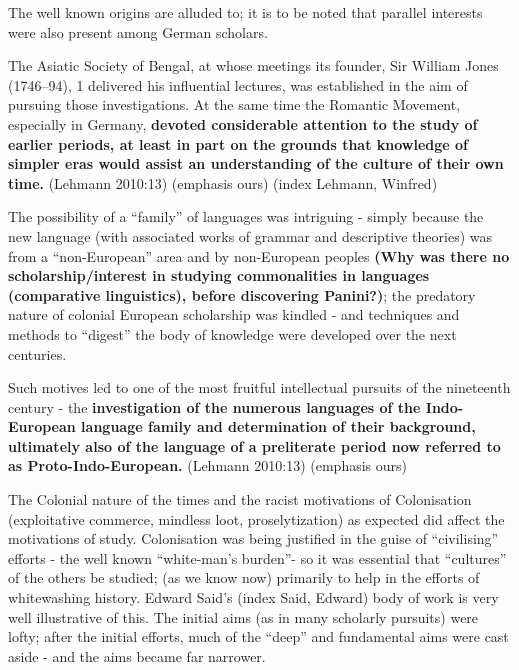 The well known origins are alluded to; it is to be noted that parallel interests were also present among German scholars.

\begin{myquote}
The Asiatic Society of Bengal, at whose meetings its founder, Sir William Jones (1746–94), 1 delivered his influential lectures, was established in the aim of pursuing those investigations. At the same time the Romantic Movement, especially in Germany, \textbf{devoted considerable attention to the study of earlier periods, at least in part on the grounds that knowledge of simpler eras would assist an understanding of the culture of their own time.} (Lehmann 2010:13) (emphasis ours) (index Lehmann, Winfred)
\end{myquote}

The possibility of a “family” of languages was intriguing - simply because the new language (with associated works of grammar and descriptive theories) was from a “non-European” area and by non-European peoples \textbf{(Why was there no scholarship/interest in studying commonalities in languages (comparative linguistics), before discovering Panini?)}; the predatory nature of colonial European scholarship was kindled - and techniques and methods to “digest” the body of knowledge were developed over the next centuries.

\begin{myquote}
Such motives led to one of the most fruitful intellectual pursuits of the nineteenth century - the \textbf{investigation of the numerous languages of the Indo-European language family and determination of their background, ultimately also of the language of a preliterate period now referred to as Proto-Indo-European. } (Lehmann 2010:13) (emphasis ours)
\end{myquote}

The Colonial nature of the times and the racist motivations of Colonisation (exploitative commerce, mindless loot, proselytization) as expected did affect the motivations of study. Colonisation was being justified in the guise of “civilising” efforts - the well known “white-man’s burden”- so it was essential that “cultures” of the others be studied; (as we know now) primarily to help in the efforts of whitewashing history. Edward Said’s (index Said, Edward) body of work is very well illustrative of this. The initial aims (as in many scholarly pursuits) were lofty; after the initial efforts, much of the “deep” and fundamental aims were cast aside - and the aims became far narrower.

